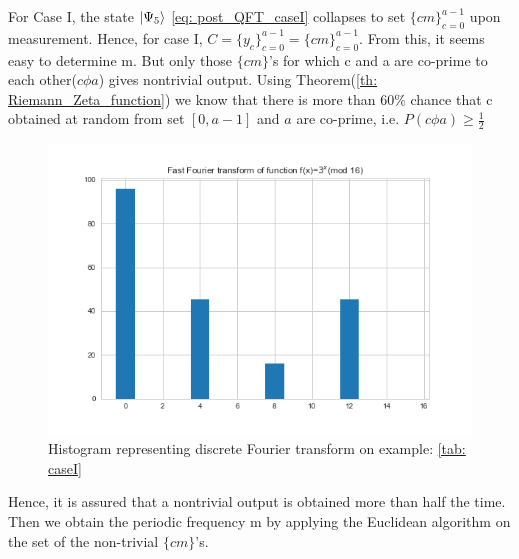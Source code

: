 For Case I, the state $\ket{\Psi_5}$ \ref{eq: post_QFT_caseI} collapses to set $\{cm\}_{c=0}^{a-1}$ upon measurement. Hence, for case I,  $C=\{y_c\}_{c=0}^{a-1} = \{cm\}_{c=0}^{a-1}$. From this, it seems easy to determine m. But only those $\{cm\}$'s for which c and a are co-prime to each other($c \phi a$) gives nontrivial output. Using Theorem(\ref{th: Riemann_Zeta_function}) we know that there is more than $60\%$ chance that c obtained at random from set $[0,a-1]$ and $a$ are co-prime, i.e. $P(c \phi a) \geq \frac{1}{2}$
\begin{figure}[H]
  \centering
  \includegraphics[scale=0.6]{figures/fft_on_3^xmod16.png}
  \caption{Histogram representing discrete Fourier transform on example: \ref{tab: caseI}}
  \label{fig: fft_on_3^xmod16}
\end{figure}

Hence, it is assured that a nontrivial output is obtained more than half the time. Then we obtain the periodic frequency m by applying the Euclidean algorithm on the set of the non-trivial $\{cm\}$'s. 

